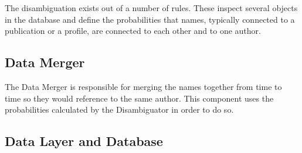 The disambiguation exists out of a number of rules. These inspect several objects in the database and define the probabilities that names, typically connected to a publication or a profile, are connected to each other and to one author.

\subsection{Data Merger}

The Data Merger is responsible for merging the names together from time to time so they would reference to the same author. This component uses the probabilities calculated by the Disambiguator in order to do so.

\subsection{Data Layer and Database}

